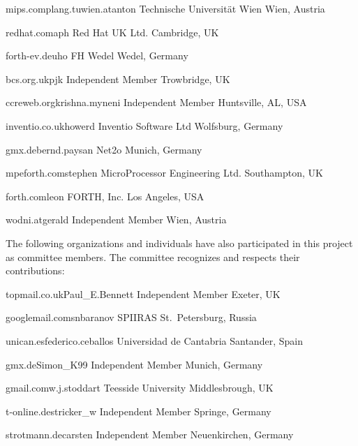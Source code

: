 	{mips.complang.tuwien.at}{anton}
	{Technische Universit\"at Wien}
	{Wien, Austria}

	{redhat.com}{aph}
	{Red Hat UK Ltd.}
	{Cambridge, UK}

	{forth-ev.de}{uho}
	{FH Wedel}
	{Wedel, Germany}

	{bcs.org.uk}{pjk}
	{Independent Member}
	{Trowbridge, UK}

	{ccreweb.org}{krishna.myneni}
	{Independent Member}
	{Huntsville, AL, USA}

	{inventio.co.uk}{howerd}
	{Inventio Software Ltd}
	{Wolfsburg, Germany}

	{gmx.de}{bernd.paysan}
	{Net2o}
	{Munich, Germany}

	{mpeforth.com}{stephen}
	{MicroProcessor Engineering Ltd.}
	{Southampton, UK}


	{forth.com}{leon}
	{FORTH, Inc.}
	{Los Angeles, USA}

	{wodni.at}{gerald}
	{Independent Member}
	{Wien, Austria}

The following organizations and individuals have also participated in
this project as committee members. The committee recognizes and
respects their contributions:

	{topmail.co.uk}{Paul\_E.Bennett}
	{Independent Member}
	{Exeter, UK}

	{googlemail.com}{snbaranov}
	{SPIIRAS}
	{St.\ Petersburg, Russia}

	{unican.es}{federico.ceballos}
	{Universidad de Cantabria}
	{Santander, Spain}

	{gmx.de}{Simon\_K99}
	{Independent Member}
	{Munich, Germany}

	{gmail.com}{w.j.stoddart}
	{Teesside University}
	{Middlesbrough, UK}

	{t-online.de}{stricker\_w}
	{Independent Member}
	{Springe, Germany}

	{strotmann.de}{carsten}
	{Independent Member}
	{Neuenkirchen, Germany}

